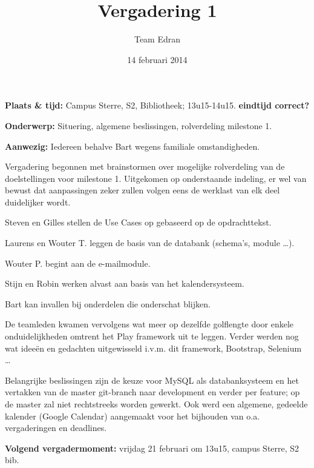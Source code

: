 \documentclass[11pt,a4paper,oneside]{article}
\title{Vergadering 1}
\author{Team Edran}
\date{14 februari 2014}
\newcommand{\todo}[1]{{\color{red} \textbf{#1}}}
\renewenvironment{itemize}[1]{\begin{compactitem}#1}{\end{compactitem}}
\begin{document}
\maketitle

\textbf{Plaats \& tijd:}
Campus Sterre, S2, Bibliotheek; 13u15-14u15. \todo{eindtijd correct?}

\textbf{Onderwerp:}
Situering, algemene beslissingen, rolverdeling milestone 1.

\textbf{Aanwezig:}
Iedereen behalve Bart wegens familiale omstandigheden.

Vergadering begonnen met brainstormen over mogelijke rolverdeling van de doelstellingen voor milestone 1. Uitgekomen op onderstaande indeling, er wel van bewust dat aanpassingen zeker zullen volgen eens de werklast van elk deel duidelijker wordt.

\begin{itemize}
\item Steven en Gilles stellen de Use Cases op gebaseerd op de opdrachttekst.
\item Laurens en Wouter T. leggen de basis van de databank (schema's, module \dots).
\item Wouter P. begint aan de e-mailmodule.
\item Stijn en Robin werken alvast aan basis van het kalendersysteem.
\item Bart kan invallen bij onderdelen die onderschat blijken.
\end{itemize}

De teamleden kwamen vervolgens wat meer op dezelfde golflengte door enkele onduidelijkheden omtrent het Play framework uit te leggen. Verder werden nog wat ideeën en gedachten uitgewisseld i.v.m. dit framework, Bootstrap, Selenium \dots

Belangrijke beslissingen zijn de keuze voor MySQL als databanksysteem en het vertakken van de master git-branch naar development en verder per feature; op de master zal niet rechtstreeks worden gewerkt. Ook werd een algemene, gedeelde kalender (Google Calendar) aangemaakt voor het bijhouden van o.a. vergaderingen en deadlines. 

\textbf{Volgend vergadermoment:} vrijdag 21 februari om 13u15, campus Sterre, S2 bib.
\end{document}
